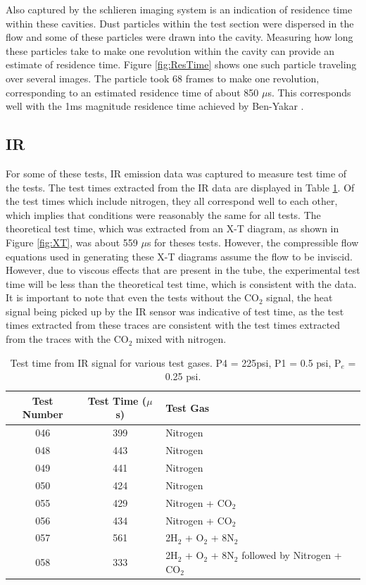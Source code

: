 Also captured by the schlieren imaging system is an indication of residence time within these cavities. Dust particles within the test section were dispersed in the flow and some of these particles were drawn into the cavity. Measuring how long these particles take to make one revolution within the cavity can provide an estimate of residence time. Figure \ref{fig:ResTime} shows one such particle traveling over several images. The particle took 68 frames to make one revolution, corresponding to an estimated residence time of about 850 $\mu$s. This corresponds well with the 1ms magnitude residence time achieved by Ben-Yakar \cite{ben2001cavity}.


\subsection{IR}

For some of these tests, IR emission data was captured to measure test time of the tests. The test times extracted from the IR data are displayed in Table \ref{Table:IRtest}. Of the test times which include nitrogen, they all correspond well to each other, which implies that conditions were reasonably the same for all tests.  The theoretical test time, which was extracted from an X-T diagram, as shown in Figure \ref{fig:XT}, was about 559 $\mu$s for theses tests. However, the compressible flow equations used in generating these X-T diagrams assume the flow to be inviscid. However, due to viscous effects that are present in the tube, the experimental test time will be less than the theoretical test time, which is consistent with the data. It is important to note that even the tests without the CO$_2$ signal, the heat signal being picked up by the IR sensor was indicative of test time, as the test times extracted from these traces are consistent with the test times extracted from the traces with the CO$_2$ mixed with nitrogen. 

\begin{table}[]
\centering
\caption[Test time calculated with IR signal]{Test time from IR signal for various test gases. P4 = 225psi, P1 = 0.5 psi, P$_e$ = 0.25 psi.}
\label{Table:IRtest}
\begin{tabular}{c|c|l}

Test Number & Test Time ($\mu$s) & Test Gas\\ \hline
046         & 399        &Nitrogen     \\ 
048         & 443        &Nitrogen     \\ 
049         & 441        &Nitrogen     \\ 
050         & 424        &Nitrogen     \\ 
055			& 429		 &Nitrogen + CO$_2$	\\
056			& 434		 &Nitrogen + CO$_2$  \\
057			& 561 		 &2H$_2$ + O$_2$ + 8N$_2$			   \\
058			& 333		 &2H$_2$ + O$_2$ + 8N$_2$ followed by Nitrogen + CO$_2$			   \\
\end{tabular}
\end{table}

